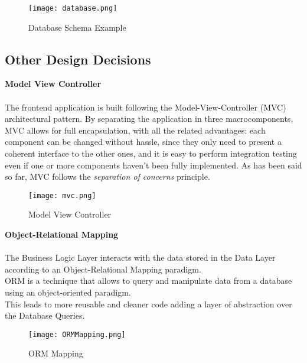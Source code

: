 \begin{figure}[H]
	\centering
	\texttt{[image: database.png]}
	\caption{Database Schema Example}
\end{figure}

\subsection{Other Design Decisions}
\textbf{Model View Controller}\\ \\
The frontend application is built following the Model-View-Controller (MVC) architectural pattern.
By separating the application in three macrocomponents, MVC allows for full encapsulation, with all the related advantages: each component can be changed without hassle, since they only need to present a coherent interface to the other ones, and it is easy to perform integration testing even if one or more components haven’t been fully implemented. As has been said so far, MVC follows the \textit{separation of concerns} principle.
\begin{figure}[H]
	\centering
	\texttt{[image: mvc.png]}
	\caption{Model View Controller }
\end{figure}

\noindent
\textbf{Object-Relational Mapping}\\ \\
The Business Logic Layer interacts with the data stored in the Data Layer according to an Object-Relational Mapping paradigm.\\
ORM is a technique that allows to query and manipulate data from a database using an object-oriented paradigm.\\
This leads to more reusable and cleaner code adding a layer of abstraction over the Database Queries.
\begin{figure}[H]
	\centering
	\texttt{[image: ORMMapping.png]}
	\caption{ORM Mapping}
\end{figure}